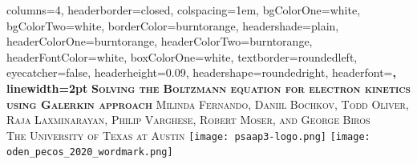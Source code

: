 \documentclass[landscape,archE,fontscale=0.285]{baposter} %
\begin{document}
\begin{poster}
{
columns=4, %
headerborder=closed, %
colspacing=1em, %
bgColorOne=white, %
bgColorTwo=white, %
borderColor=burntorange, %
headershade=plain,
headerColorOne=burntorange, %
headerColorTwo=burntorange, %
headerFontColor=white, %
boxColorOne=white, %
textborder=roundedleft, %
eyecatcher=false, %
headerheight=0.09\textheight, %
headershape=roundedright, %
headerfont=\Large\bf\textsc, %
linewidth=2pt %
}
%
{}
{\bf\textsc{Solving the Boltzmann equation for electron kinetics using Galerkin approach}\vspace{0.01em}} %
{\textsc{\small Milinda Fernando, Daniil Bochkov, Todd Oliver, Raja Laxminarayan, Philip Varghese, Robert Moser, and George Biros \hspace{12pt} \\The University of Texas at Austin}} %
{%
%
\hspace{12pt} \texttt{[image: psaap3-logo.png]}%
\hspace{12pt} \texttt{[image: oden\_pecos\_2020\_wordmark.png]}%
}


\end{poster}
\end{document}
